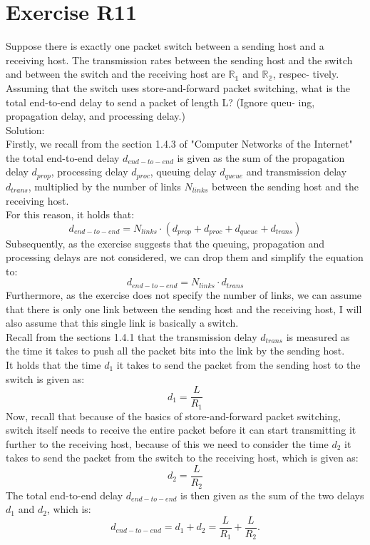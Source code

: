 \section{Exercise R11}

Suppose there is exactly one packet switch between a sending host and a
receiving host. The transmission rates between the sending host and the
switch and between the switch and the receiving host are $\mathbb{R_1}$ and $\mathbb{R_2}$, respec-
tively. Assuming that the switch uses store-and-forward packet switching,
what is the total end-to-end delay to send a packet of length L? (Ignore queu-
ing, propagation delay, and processing delay.)\\
Solution: \\
Firstly, we recall from the section 1.4.3 of "Computer Networks of the Internet" the total end-to-end delay $d_{end-to-end}$ is given as the sum of the propagation delay $d_{prop}$, processing delay $d_{proc}$, queuing delay $d_{queue}$ and transmission delay $d_{trans}$, multiplied by the number of links $N_{links}$ between the sending host and the receiving host. \\
For this reason, it holds that: \\
\begin{equation}
	d_{end-to-end} = N_{links} \cdot (d_{prop} + d_{proc} + d_{queue} + d_{trans})
\end{equation}
Subsequently, as the exercise suggests that the queuing, propagation and processing delays are not considered, we can drop them and simplify the equation to: \\
\begin{equation}
	d_{end-to-end} = N_{links} \cdot d_{trans}
\end{equation}
Furthermore, as the exercise does not specify the number of links, we can assume that there is only one link between the sending host and the receiving host, I will also assume that this single link is basically a switch.\\
Recall from the sections 1.4.1 that the transmission delay $d_{trans}$ is measured as the time it takes to push all the packet bits into the link by the sending host. \\
It holds that the time $d_1$ it takes to send the packet from the sending host to the switch is given as: \\
\begin{equation}
	d_1 = \frac{L}{R_1}
\end{equation}
Now, recall that because of the basics of store-and-forward packet switching, switch itself needs to receive the entire packet before it can start transmitting it further to the receiving host, because of this we need to consider the time $d_2$ it takes to send the packet from the switch to the receiving host, which is given as: \\
\begin{equation}
	d_2 = \frac{L}{R_2}
\end{equation}
The total end-to-end delay $d_{end-to-end}$ is then given as the sum of the two delays $d_1$ and $d_2$, which is: \\
\begin{equation}
	d_{end-to-end} = d_1 + d_2 = \frac{L}{R_1} + \frac{L}{R_2}.
\end{equation}
